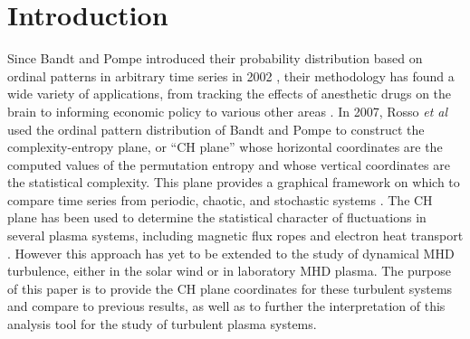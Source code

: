 \documentclass[aps,prx,twocolumn,secnumarabic,nobalancelastpage,amsmath,amssymb,
nofootinbib]{revtex4-1}
\begin{document}
\section{Introduction}
Since Bandt and Pompe introduced their probability distribution based on ordinal patterns in arbitrary time series in 2002 \cite{bandt2002}, their methodology has found a wide variety of applications, from tracking the effects of anesthetic drugs on the brain \cite{li2010,jordan2008,olofsen2008} to informing economic policy \cite{bariviera2013,zunino2010,zunino2011} to various other areas \cite{kowalski2007,soriano2011,saco2010,suyal2012,sun2010}. In 2007, Rosso \textit{et al} used the ordinal pattern distribution of Bandt and Pompe to construct the complexity-entropy plane, or ``CH plane''  whose horizontal coordinates are the computed values of the permutation entropy and whose vertical coordinates are the statistical complexity. This plane provides a graphical framework on which to compare time series from periodic, chaotic, and stochastic systems \cite{rosso2007}. The CH plane has been used to determine the statistical character of fluctuations in several plasma systems, including magnetic flux ropes \cite{gekelman2014} and electron heat transport \cite{maggs2013}. However this approach has yet to be extended to the study of dynamical MHD turbulence, either in the solar wind or in laboratory MHD plasma. The purpose of this paper is to provide the CH plane coordinates for these turbulent systems and compare to previous results, as well as to further the interpretation of this analysis tool for the study of turbulent plasma systems.
\end{document}
